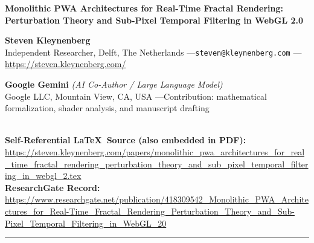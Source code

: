 \documentclass[11pt, a4paper]{article}
\begin{document}

\vspace{0.35em}
{\LARGE\textbf{Monolithic PWA Architectures for Real-Time Fractal Rendering: Perturbation Theory and Sub-Pixel Temporal Filtering in WebGL 2.0}}

\vspace{0.6em}
\noindent\textbf{Steven Kleynenberg}\\
{\small Independent Researcher, Delft, The Netherlands \quad---\quad \texttt{steven@kleynenberg.com} \quad---\quad \url{https://steven.kleynenberg.com/}}

\vspace{0.3em}
\noindent\textbf{Google Gemini} {\small\textit{(AI Co-Author / Large Language Model)}}\\
{\small Google LLC, Mountain View, CA, USA \quad---\quad Contribution: mathematical formalization, shader analysis, and manuscript drafting}

\vspace{0.35em}
\\
{\small\textbf{Self-Referential \LaTeX\ Source (also embedded in PDF):} \url{https://steven.kleynenberg.com/papers/monolithic_pwa_architectures_for_real_time_fractal_rendering_perturbation_theory_and_sub_pixel_temporal_filtering_in_webgl_2.tex}}\\
{\small\textbf{ResearchGate Record:} \url{https://www.researchgate.net/publication/418309542_Monolithic_PWA_Architectures_for_Real-Time_Fractal_Rendering_Perturbation_Theory_and_Sub-Pixel_Temporal_Filtering_in_WebGL_20}}

\vspace{0.6em}
\noindent\rule{\textwidth}{0.5pt}
\vspace{0.2em}
\end{document}
